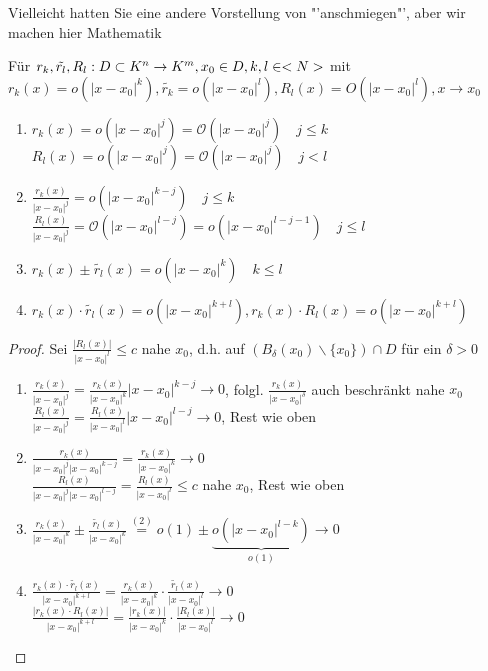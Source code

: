 \smiley{} Vielleicht hatten Sie eine andere Vorstellung von "'anschmiegen"', aber wir machen hier 
Mathematik \smiley{}

\begin{proposition}
	Für $r_k,\tilde{r_l},R_l:D\subset K^n\to K^m,x_0\in D,k,l\in<N>$ mit \\
	$r_k(x)=o(\vert x-x_0\vert^k),\tilde{r_k}=o(\vert x-x_0\vert^l),R_l(x)=O(\vert x-x_0\vert ^l),x\to x_0$
	\begin{enumerate}
		\item $r_k(x)=o(\vert x-x_0\vert^j)=\mathcal{O}(\vert x-x_0\vert^j)\quad j\le k$ \\
		$R_l(x)=o(\vert x-x_0\vert^j)=\mathcal{O}(\vert x-x_0\vert^j)\quad j<l$
		\item $\frac{r_k(x)}{\vert x-x_0\vert^j}=o(\vert x-x_0\vert^{k-j})\quad j\le k$ \\
		$\frac{R_l(x)}{\vert x-x_0\vert^j}=\mathcal{O}(\vert x-x_0\vert^{l-j})=o(\vert x-x_0\vert^{l-j-1})\quad j\le l$
		\item $r_k(x)\pm \tilde{r_l}(x)=o(\vert x-x_0\vert ^k)\quad k\le l$
		\item $r_k(x)\cdot \tilde{r_l}(x)=o(\vert x-x_0\vert^{k+l}),r_k(x)\cdot R_l(x)=o(\vert x-x_0\vert^{k+l})$
	\end{enumerate}
\end{proposition}
\begin{proof}
	Sei $\frac{\vert R_l(x)\vert}{\vert x-x_0\vert^l}\le c$ nahe $x_0$, d.h. auf $(B_{\delta}(x_0)\backslash\{x_0\})\cap D$ für ein $\delta>0$
	\begin{enumerate}
		\item $\frac{r_k(x)}{\vert x-x_0\vert^j}=\frac{r_k(x)}{\vert x-x_0\vert^k}\vert x-x_0\vert^{k-j}\to 0$, folgl. $\frac{r_k(x)}{\vert x-x_0\vert^{\delta}}$ auch beschränkt nahe $x_0$ \\
		$\frac{R_l(x)}{\vert  x-x_0\vert^j}=\frac{R_l(x)}{\vert x-x_0\vert^l}\vert x-x_0\vert^{l-j}\to 0$, Rest wie oben
		\item $\frac{r_k(x)}{\vert x-x_0\vert^j \vert x-x_0\vert^{k-j}}=\frac{r_k(x)}{\vert x-x_0\vert^k}\to 0$ \\
		$\frac{R_l(x)}{\vert x-x_0\vert^j \vert x-x_0\vert^{l-j}}=\frac{R_l(x)}{\vert x-x_0\vert^l}\le c$ nahe $x_0$, Rest wie oben
		\item $\frac{r_k(x)}{\vert x-x_0\vert^k}\pm\frac{\tilde{r_l}(x)}{\vert x-x_0\vert^k}\overset{(2)}{=}o(1)\pm\underbrace{o(\vert x-x_0\vert^{l-k})}_{o(1)}\to 0$
		\item $\frac{r_k(x)\cdot \tilde{r_l}(x)}{\vert x-x_0\vert^{k+l}}=\frac{r_k(x)}{\vert x-x_0\vert^k}\cdot\frac{\tilde{r_l}(x)}{\vert x-x_0\vert^l}\to 0$ \\
		$\frac{\vert r_k(x)\cdot R_l(x)\vert}{\vert x-x_0\vert^{k+l}}=\frac{\vert r_k(x)\vert}{\vert x-x_0\vert^k}\cdot\frac{\vert R_l(x)\vert}{\vert x-x_0\vert^l}\to 0$
	\end{enumerate}
\end{proof}